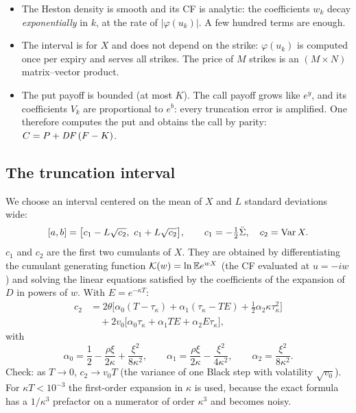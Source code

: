 \begin{perche}[title={Why COS is fast, and why it prices puts}]
\begin{itemize}
\item The Heston density is smooth and its CF is analytic: the coefficients $w_k$ decay \emph{exponentially} in $k$,
at the rate of $|\varphi(u_k)|$. A few hundred terms are enough.
\item The interval is for $X$ and does not depend on the strike: $\varphi(u_k)$ is computed once per expiry and serves
all strikes. The price of $M$ strikes is an $(M\times N)$ matrix--vector product.
\item The put payoff is bounded (at most $K$). The call payoff grows like $e^y$, and its coefficients $V_k$ are
proportional to $e^b$: every truncation error is amplified. One therefore computes the put and obtains the call by
parity: \mbox{$C=P+\mathit{DF}\,(F-K)$}.
\end{itemize}
\end{perche}

\subsection{The truncation interval}
We choose an interval centered on the mean of $X$ and $L$ standard deviations wide:
\begin{equation}\label{eq:cos-range}
[a,b]=\big[c_1-L\sqrt{c_2},\ c_1+L\sqrt{c_2}\big],\qquad c_1=-\tfrac12\bar\Sigma,\quad c_2=\operatorname{Var} X .
\end{equation}
$c_1$ and $c_2$ are the first two cumulants of $X$. They are obtained by differentiating the cumulant generating
function $\mathcal K(w)=\ln\mathbb{E} e^{wX}$ (the CF evaluated at $u=-iw$) and solving the linear equations satisfied by the
coefficients of the expansion of $D$ in powers of $w$. With $E=e^{-\kappa T}$:
\begin{equation}\label{eq:c2}
\begin{split}
c_2&=2\theta\Big[\alpha_0(T-\tau_\kappa)+\alpha_1(\tau_\kappa-TE)+\tfrac12\alpha_2\kappa\tau_\kappa^2\Big]\\
&\quad+2v_0\Big[\alpha_0\tau_\kappa+\alpha_1TE+\alpha_2E\tau_\kappa\Big],
\end{split}
\end{equation}
with
\[
\alpha_0=\frac12-\frac{\rho\xi}{2\kappa}+\frac{\xi^2}{8\kappa^2},\qquad
\alpha_1=\frac{\rho\xi}{2\kappa}-\frac{\xi^2}{4\kappa^2},\qquad
\alpha_2=\frac{\xi^2}{8\kappa^2}.
\]
Check: as $T\to0$, $c_2\to v_0T$ (the variance of one Black step with volatility $\sqrt{v_0}$). For
$\kappa T<10^{-3}$ the first-order expansion in $\kappa$ is used, because the exact formula has a $1/\kappa^3$
prefactor on a numerator of order $\kappa^3$ and becomes noisy.

